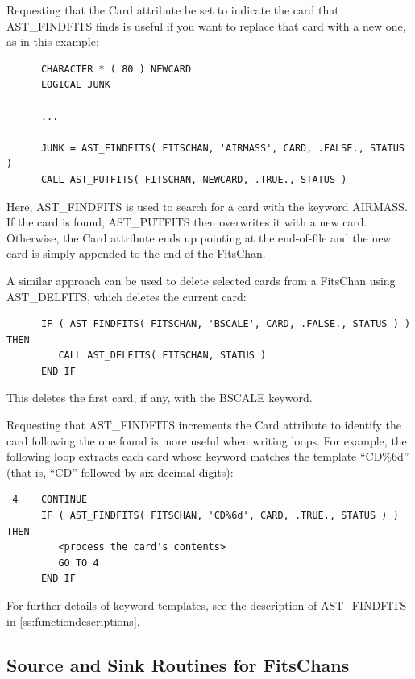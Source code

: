 \documentclass[twoside,11pt]{article}
\newcommand{\htmlref}[2]{#1}
\newcommand{\appref}[1]{Appendix~\ref{#1}}
\renewcommand{\appref}[1]{\ref{#1}}
\begin{document}
Requesting that the Card attribute be set to indicate the card that
AST\_FINDFITS finds is useful if you want to replace that card with a
new one, as in this example:

\small
\begin{verbatim}
      CHARACTER * ( 80 ) NEWCARD
      LOGICAL JUNK

      ...

      JUNK = AST_FINDFITS( FITSCHAN, 'AIRMASS', CARD, .FALSE., STATUS )
      CALL AST_PUTFITS( FITSCHAN, NEWCARD, .TRUE., STATUS )
\end{verbatim}
\normalsize

Here, AST\_FINDFITS is used to search for a card with the keyword
AIRMASS. If the card is found, \htmlref{AST\_PUTFITS}{AST_PUTFITS} then overwrites it with a
new card.  Otherwise, the Card attribute ends up pointing at the
end-of-file and the new card is simply appended to the end of the
FitsChan.

A similar approach can be used to delete selected cards from a
FitsChan using \htmlref{AST\_DELFITS}{AST_DELFITS}, which deletes the current card:

\small
\begin{verbatim}
      IF ( AST_FINDFITS( FITSCHAN, 'BSCALE', CARD, .FALSE., STATUS ) ) THEN
         CALL AST_DELFITS( FITSCHAN, STATUS )
      END IF
\end{verbatim}
\normalsize

This deletes the first card, if any, with the BSCALE keyword.

Requesting that AST\_FINDFITS increments the Card attribute to
identify the card following the one found is more useful when writing
loops.  For example, the following loop extracts each card whose
keyword matches the template ``CD\%6d'' (that is, ``CD'' followed by
six decimal digits):

\small
\begin{verbatim}
 4    CONTINUE
      IF ( AST_FINDFITS( FITSCHAN, 'CD%6d', CARD, .TRUE., STATUS ) ) THEN
         <process the card's contents>
         GO TO 4
      END IF
\end{verbatim}
\normalsize

For further details of keyword templates, see the description of
AST\_FINDFITS in \appref{ss:functiondescriptions}.

\subsection{\label{ss:fitssourceandsink}Source and Sink Routines for FitsChans}
\end{document}
